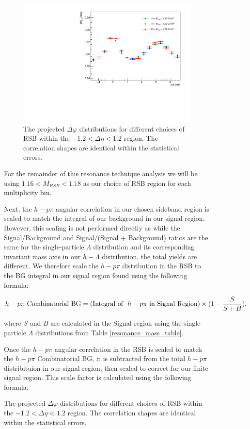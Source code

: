 \documentclass[ALICE,manyauthors]{ALICE_analysis_notes}
\begin{document}
\begin{figure}[ht]
\begin{figure}[ht]
\centering
\includegraphics[width=4in]{figures/h_lambda_dphi_rsbcomp_0_20.pdf}
\caption{The projected $\Delta\varphi$ distributions for different choices of RSB within the $-1.2 < \Delta\eta < 1.2$ region. The correlation shapes are identical within the statistical errors.}
\label{normRSBcomp}
\end{figure}

For the remainder of this resonance technique analysis we will be using $1.16 < M_{RSB} < 1.18$ as our choice of RSB region for each multiplicity bin. 

Next, the $h-p\pi$ angular correlation in our chosen sideband region is scaled to match the integral of our background in our signal region. However, this scaling is not performed directly as while the Signal/Background and Signal/(Signal + Background) ratios are the same for the single-particle $\Lambda$ distribution and its corresponding invariant mass axis in our $h-\Lambda$ distribution, the total yields are different. We therefore scale the $h-p\pi$ distribution in the RSB to the BG integral in our signal region found using the following formula:

\begin{align}
	h-p\pi \text{\space Combinatorial BG} = (\text{Integral of \space} h-p\pi \text{\space in Signal Region}) \times (1 - \frac{S}{S+B}),
\end{align}

where $S$ and $B$ are calculated in the Signal region using the single-particle $\Lambda$ distributions from Table \ref{resonance_mass_table}.

Once the $h-p\pi$ angular correlation in the RSB is scaled to match the $h-p\pi$ Combinatorial BG, it is subtracted from the total $h-p\pi$ distribituion in our signal region, then scaled to correct for our finite signal region. This scale factor is calculated using the following formula:


\end{figure}
\end{document}
